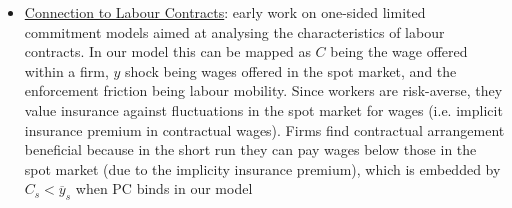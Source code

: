 \documentclass{article}
\begin{document}
\begin{itemize}
\begin{itemize}
    \end{itemize}
    \item \underline{Connection to Labour Contracts}: early work on one-sided limited commitment models aimed at analysing the characteristics of labour contracts. In our model this can be mapped as $C$ being the wage offered within a firm, $y$ shock being wages offered in the spot market, and the enforcement friction being labour mobility. Since workers are risk-averse, they value insurance against fluctuations in the spot market for wages (i.e. implicit insurance premium in contractual wages). Firms find contractual arrangement beneficial because in the short run they can pay wages below those in the spot market (due to the implicity insurance premium), which is embedded by $C_{s} < \overline{y}_{s}$ when PC binds in our model
\end{itemize}

\newpage
\end{document}
